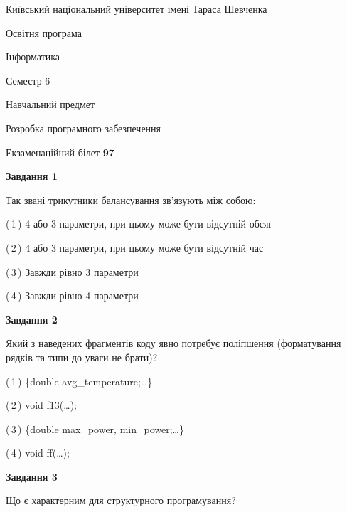 \documentclass[10pt, ukrainian]{article}
\begin{document}
{{\begin {small}\par
{ \center  Київський національний університет імені Тараса Шевченка \par}
{\parbox {5 cm}{Освітня програма \hfill}{\parbox {7 cm}{Інформатика \hfill}}\parbox {6 cm}{\hfill Семестр 6}}\par
{\parbox {5 cm} {Навчальний предмет \hfill}\parbox {7 cm}{Розробка програмного забезпечення \hfill}\parbox {6cm}{\hfill}\par}\vspace{-7pt} \end{small}}{\center Екзаменаційний білет \No \textbf
{ 97 }\par}}
{
\begin {large}
{\begin {center}\textbf{Завдання 1}\end {center}}\par
Так звані трикутники балансування зв'язують між собою:\par
\vspace{2mm}



(\,1\,) 4 або 3 параметри, при цьому може бути відсутній обсяг %



(\,2\,) 4 або 3 параметри, при цьому може бути відсутній час%



(\,3\,) Завжди рівно 3 параметри%



(\,4\,) Завжди рівно 4 параметри%


{\begin {center}\textbf{Завдання 2}\end {center}}\par
Який з наведених фрагментів коду явно потребує поліпшення (форматування рядків та типи до уваги не брати)?\par
\vspace{2mm}



(\,1\,) \{double avg\_temperature;…\} %



(\,2\,) void f13(…);%



(\,3\,) \{double max\_power, min\_power;…\} %



(\,4\,) void ff(…);%


{\begin {center}\textbf{Завдання 3}\end {center}}\par
Що є характерним для структурного програмування?\par
\vspace{2mm}




\end{large}}
\end{document}
